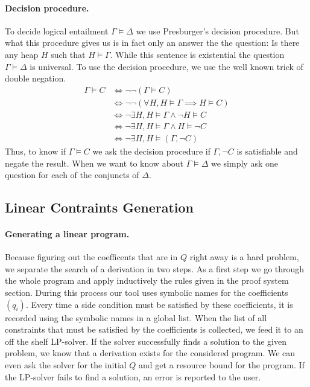 \documentclass[10pt]{article}
\begin{document}
\paragraph{Decision procedure.}
To decide logical entailment $\Gamma \models \Delta$ we use
Presburger's decision procedure.  But what this procedure gives us
is in fact only an answer the the question: Is there any heap $H$
such that $H \models \Gamma$.  While this sentence is existential
the question $\Gamma \models \Delta$ is universal.  To use the
decision procedure, we use the well known trick of double negation.
\begin{align*}
\Gamma \models C
&\Leftrightarrow \neg\neg (\Gamma \models C) \\
&\Leftrightarrow \neg\neg (\forall H, H\models\Gamma \implies H\models C) \\
&\Leftrightarrow \neg \exists H, H\models\Gamma \land \neg H\models C \\
&\Leftrightarrow \neg \exists H, H\models\Gamma \land H\models \neg C \\
&\Leftrightarrow \neg \exists H, H\models (\Gamma, \neg C)
\end{align*}
Thus, to know if $\Gamma \models C$ we ask the decision
procedure if $\Gamma, \neg C$ is satisfiable and negate the result.
When we want to know about $\Gamma \models \Delta$ we simply ask
one question for each of the conjuncts of $\Delta$.

\subsection{Linear Contraints Generation}

\paragraph{Generating a linear program.}
Because figuring out the coefficents that are in $Q$ right away is a hard
problem, we separate the search of a derivation in two steps.  As a first
step we go through the whole program and apply inductively the rules
given in the proof system section.  During this process our tool uses
symbolic names for the coefficients $(q_i)$.  Every time a side condition
must be satisfied by these coefficients, it is recorded using the symbolic
names in a global list.  When
the list of all constraints that must be satisfied by the coefficients is
collected, we feed it to an off the shelf LP-solver.  If the solver successfully
finds a solution to the given problem, we know that a derivation
exists for the considered program.  We can even ask the solver
for the initial $Q$ and get a resource bound for the program.
If the LP-solver fails to find a solution, an error is reported to the
user.
\end{document}
